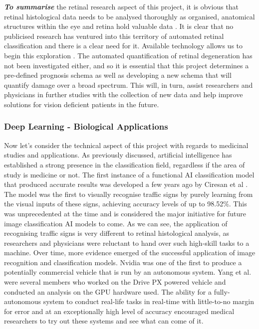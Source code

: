 \documentclass[a4paper]{article}
\begin{document}
        \textbf{\textit{To summarise}} the retinal research aspect of this project, it is obvious that retinal histological data needs to be analysed thoroughly as organised, anatomical structures within the eye and retina hold valuable data \cite{RN16}. It is clear that no publicised research has ventured into this territory of automated retinal classification and there is a clear need for it. Available technology allows us to begin this exploration \cite{RN6}\cite{RN13}\cite{RN16}\cite{RN14}. The automated quantification of retinal degeneration has not been investigated either, and so it is essential that this project determines a pre-defined prognosis schema as well as developing a new schema that will quantify damage over a broad spectrum. This will, in turn, assist researchers and physicians in further studies with the collection of new data and help improve solutions for vision deficient patients in the future.
        \vspace{3mm}

        \subsubsection{Deep Learning - Biological Applications}
        Now let's consider the technical aspect of this project with regards to medicinal studies and applications. As previously discussed, artificial intelligence has established a strong presence in the classification field, regardless if the area of study is medicine or not. The first instance of a functional AI classification model that produced accurate results was developed a few years ago by Ciresan et al \cite{RN19}. The model was the first to visually recognise traffic signs by purely learning from the visual inputs of these signs, achieving accuracy levels of up to 98.52\%. This was unprecedented at the time and is considered the major initiative for future image classification AI models to come. As we can see, the application of recognising traffic signs is very different to retinal histological analysis, as researchers and physicians were reluctant to hand over such high-skill tasks to a machine. Over time, more evidence emerged of the successful application of image recognition and classification models. Nvidia was one of the first to produce a potentially commercial vehicle that is run by an autonomous system. Yang et al. \cite{RN17} were several members who worked on the Drive PX powered vehicle and conducted an analysis on the GPU hardware used. The ability for a fully-autonomous system to conduct real-life tasks in real-time with little-to-no margin for error and at an exceptionally high level of accuracy encouraged medical researchers to try out these systems and see what can come of it.
        \vspace{3mm}
\end{document}
